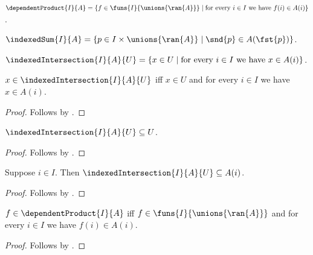 \begin{definition}\label{dependent_product}
    $\dependentProduct{I}{A}
        =\{f\in\funs{I}{\unions{\ran{A}}}\mid
            \text{for every $i\in I$ we have $f(i)\in A(i)$}\}$.
\end{definition}

\begin{definition}\label{indexed_sum}
    $\indexedSum{I}{A}
        =\{p\in I\times\unions{\ran{A}}\mid
            \snd{p}\in A(\fst{p})\}$.
\end{definition}

\begin{definition}\label{indexed_intersection}
    $\indexedIntersection{I}{A}{U}
        =\{x\in U\mid \text{for every $i\in I$ we have $x\in A(i)$}\}$.
\end{definition}

\begin{proposition}\label{indexed_intersection_iff}
    $x\in\indexedIntersection{I}{A}{U}$ iff
        $x\in U$ and for every $i\in I$ we have $x\in A(i)$.
\end{proposition}
\begin{proof}
    Follows by .
\end{proof}

\begin{proposition}\label{indexed_intersection_subseteq}
    $\indexedIntersection{I}{A}{U}\subseteq U$.
\end{proposition}
\begin{proof}
    Follows by .
\end{proof}

\begin{proposition}\label{indexed_intersection_member_subseteq}
    Suppose $i\in I$.
    Then $\indexedIntersection{I}{A}{U}\subseteq A(i)$.
\end{proposition}
\begin{proof}
    Follows by .
\end{proof}

\begin{proposition}\label{dependent_product_iff}
    $f\in\dependentProduct{I}{A}$ iff
        $f\in\funs{I}{\unions{\ran{A}}}$ and
        for every $i\in I$ we have $f(i)\in A(i)$.
\end{proposition}
\begin{proof}
    Follows by .
\end{proof}

